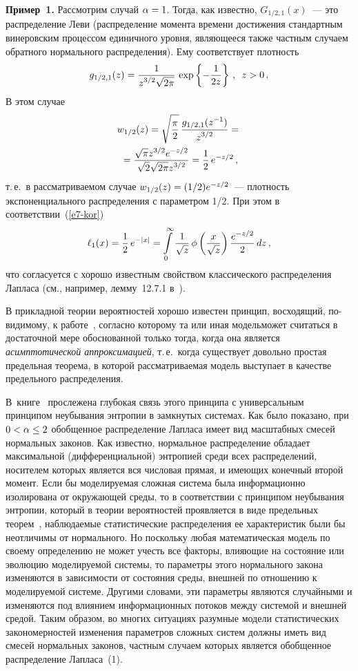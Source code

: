 \begin{multicols}{2}
\smallskip

\noindent
\textbf{Пример~1.} Рассмотрим случай $\alpha\hm=1$. Тогда, как известно,
$G_{1/2,1}(x)$~--- это распределение Леви (распределение момента
времени достижения стандартным винеровским процессом единичного
уровня, являющееся также частным случаем обратного нормального
распределения). Ему соответствует плотность
$$
g_{1/2,1}(z)=\displaystyle\frac{\displaystyle 1\mathstrut}{\displaystyle z^{3/2}\sqrt{2\pi}\mathstrut}\,\exp\left\{-\displaystyle\frac{\displaystyle 1\mathstrut}{\displaystyle 2z\mathstrut}\right\}\,,\enskip
z>0\,.
$$
В этом случае
\begin{multline*}
w_{1/2}(z)=\sqrt{\displaystyle\frac{\displaystyle \pi\mathstrut}{\displaystyle 2\mathstrut}}\,\displaystyle\frac{\displaystyle g_{1/2,1}(z^{-1})\mathstrut}{\displaystyle z^{3/2}\mathstrut}={}\\
{}=\displaystyle\frac{\displaystyle \sqrt{\pi}
z^{3/2}e^{-z/2}\mathstrut}{\displaystyle \sqrt{2}\sqrt{2\pi}
z^{3/2}\mathstrut}=\displaystyle\frac{\displaystyle 1\mathstrut}{\displaystyle 2\mathstrut}\,e^{-z/2}\,,
\end{multline*}
т.\,е.\ в рассматриваемом случае
$w_{1/2}(z)\hm=(1/2)e^{-z/2}$~--- плотность
экспоненциального распределения с параметром 1/2.
При этом в соответствии~(\ref{e7-kor})
$$
\ell_1(x)=\displaystyle\frac{\displaystyle 1\mathstrut}{\displaystyle 2\mathstrut}\,e^{-|x|}=\int\limits_0^{\infty}\displaystyle\frac{\displaystyle 1\mathstrut}{\displaystyle \sqrt{z}\mathstrut}\,\phi\left(\displaystyle\frac{\displaystyle x\mathstrut}{\displaystyle \sqrt{z}\mathstrut}\right)
\displaystyle\frac{\displaystyle e^{-z/2}\mathstrut}{\displaystyle 2\mathstrut}\,dz\,,
$$
что согласуется с хорошо известным свойством классического
распределения Лапласа (см., например, лемму~12.7.1 в~\cite{KorolevBeningShorgin2011-k}).

\smallskip

В прикладной теории вероятностей хорошо известен принцип,
восходящий, по-ви\-ди\-мо\-му, к работе~\cite{GnedenkoKolmogorov1949},
согласно которому та или иная модель\linebreak может считаться в достаточной
мере обоснованной только тогда, когда она является {\it
асимптотической аппроксимацией}, т.\,е.\ когда существует довольно
простая предельная теорема, в которой рассматрива\-емая модель
выступает в качестве предельного распределения. 

В~книге~\cite{GnedenkoKorolev1996-k} 
прослежена глубокая связь этого принципа
с универсальным принципом неубывания энтропии в замкнутых системах.
Как было показано, при $0\hm<\alpha\hm\le2$ обобщенное распределение
Лапласа имеет вид масштабных смесей нормальных законов. Как
известно, нормальное распределение обладает максимальной
(дифференциальной) энтропией среди всех распределений, носителем
которых является вся чис\-ло\-вая прямая, и имеющих конечный второй
момент. Если бы моделируемая слож\-ная сис\-те\-ма была информационно
изолирована от окружающей среды, то в соответствии с принципом
неубывания энтропии, который в тео\-рии вероятностей проявляется в
виде предельных тео\-рем~\cite{GnedenkoKorolev1996-k}, наблюдаемые
статистические распределения ее характеристик были бы неотличимы от
нормального. Но поскольку любая математическая модель по своему
определению не может учесть все факторы, влияющие на состояние или
эволюцию моделируемой системы, то параметры этого нормального закона
изменяются в зависимости от состояния среды, внешней по отношению к
моделируемой системе. Другими словами, эти параметры являются
случайными и изменяются под влиянием информационных потоков между
системой и внешней средой. 
%
Таким образом, во многих ситуациях
разумные модели статистических закономерностей изменения параметров
сложных сис\-тем должны иметь вид смесей нормальных законов, част\-ным
случаем которых является обобщенное распределение Лапласа~(1).


\end{multicols}
